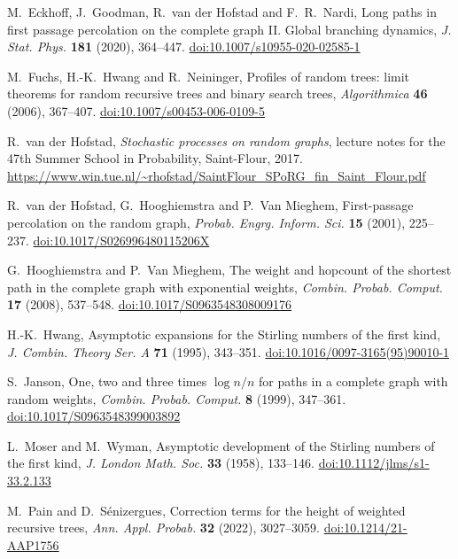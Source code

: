  M.~Eckhoff, J.~Goodman, R.~van der Hofstad and F.~R.~Nardi, Long paths in first passage percolation on
the complete graph II. Global branching dynamics, \emph{J. Stat. Phys.} \textbf{181} (2020), 364--447.
\href{https://doi.org/10.1007/s10955-020-02585-1}{doi:10.1007/s10955-020-02585-1}

 M.~Fuchs, H.-K.~Hwang and R.~Neininger, Profiles of random trees: limit theorems for random recursive
trees and binary search trees, \emph{Algorithmica} \textbf{46} (2006), 367--407.
\href{https://doi.org/10.1007/s00453-006-0109-5}{doi:10.1007/s00453-006-0109-5}

 R.~van der Hofstad, \emph{Stochastic processes on random graphs}, lecture notes for the 47th Summer
School in Probability, Saint-Flour, 2017.
\url{https://www.win.tue.nl/~rhofstad/SaintFlour_SPoRG_fin_Saint_Flour.pdf}

 R.~van der Hofstad, G.~Hooghiemstra and P.~Van Mieghem, First-passage percolation on the random
graph, \emph{Probab. Engrg. Inform. Sci.} \textbf{15} (2001), 225--237.
\href{https://doi.org/10.1017/S026996480115206X}{doi:10.1017/S026996480115206X}

 G.~Hooghiemstra and P.~Van Mieghem, The weight and hopcount of the shortest path in the complete graph
with exponential weights, \emph{Combin. Probab. Comput.} \textbf{17} (2008), 537--548.
\href{https://doi.org/10.1017/S0963548308009176}{doi:10.1017/S0963548308009176}

 H.-K.~Hwang, Asymptotic expansions for the Stirling numbers of the first kind,
\emph{J. Combin. Theory Ser. A} \textbf{71} (1995), 343--351.
\href{https://doi.org/10.1016/0097-3165(95)90010-1}{doi:10.1016/0097-3165(95)90010-1}

 S.~Janson, One, two and three times $\log n/n$ for paths in a complete graph with random weights,
\emph{Combin. Probab. Comput.} \textbf{8} (1999), 347--361.
\href{https://doi.org/10.1017/S0963548399003892}{doi:10.1017/S0963548399003892}

 L.~Moser and M.~Wyman, Asymptotic development of the Stirling numbers of the first kind,
\emph{J. London Math. Soc.} \textbf{33} (1958), 133--146.
\href{https://doi.org/10.1112/jlms/s1-33.2.133}{doi:10.1112/jlms/s1-33.2.133}

 M.~Pain and D.~S\'enizergues, Correction terms for the height of weighted recursive trees,
\emph{Ann. Appl. Probab.} \textbf{32} (2022), 3027--3059. \href{https://doi.org/10.1214/21-AAP1756}{doi:10.1214/21-AAP1756}

